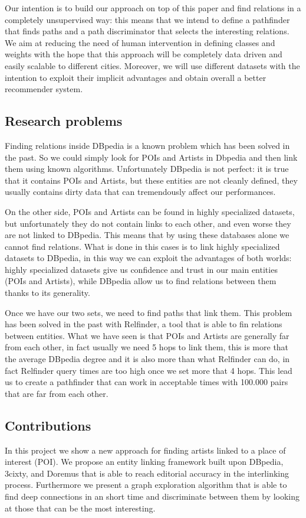 \documentclass[paper=a4, fontsize=11pt]{scrartcl}
\begin{document}
Our intention is to build our approach on top of this paper and find relations in a completely unsupervised way: this means that we intend to define a pathfinder that finds paths and a path discriminator that selects the interesting relations. We aim at reducing the need of human intervention in defining classes and weights with the hope that this approach will be completely data driven and easily scalable to different cities. Moreover, we will use different datasets with the intention to exploit their implicit advantages and obtain overall a better recommender system.

\subsection{Research problems}
Finding relations inside DBpedia is a known problem which has been solved in the past. So we could simply look for POIs and Artists in Dbpedia and then link them using known algorithms.
Unfortunately DBpedia is not perfect: it is true that it contains POIs and Artists, but these entities are not cleanly defined, they usually contains dirty data that can tremendously affect our performances.

On the other side, POIs and Artists can be found in highly specialized datasets, but unfortunately they do not contain links to each other, and even worse they are not linked to DBpedia. This means that by using these databases alone we cannot find relations.
What is done in this cases is to link highly specialized datasets to DBpedia, in this way we can exploit the advantages of both worlds: highly specialized datasets give us confidence and trust in our main entities (POIs and Artists), while DBpedia allow us to find relations between them thanks to its generality.

Once we have our two sets, we need to find paths that link them. This problem has been solved in the past with Relfinder, a tool that is able to fin relations between entities.
What we have seen is that POIs and Artists are generally far from each other, in fact usually we need 5 hops to link them, this is more that the average DBpedia degree and it is also more than what Relfinder can do, in fact Relfinder query times are too high once we set more that 4 hops. This lead us to create a pathfinder that can work in acceptable times with 100.000 pairs that are far from each other.

\subsection{Contributions}
In this project we show a new approach for finding artists linked to a place of interest (POI). We propose an entity linking framework built upon DBpedia, 3cixty, and Doremus that is able to reach editorial accuracy in the interlinking process. Furthermore we present a graph exploration algorithm that is able to find deep connections in an short time and discriminate between them by looking at those that can be the most interesting. 
\end{document}
